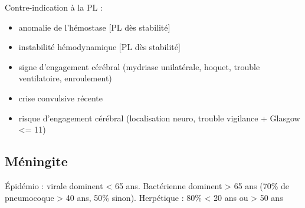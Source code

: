 \documentclass{article}
\begin{document}
Contre-indication à la PL :

\begin{itemize}
\item
  anomalie de l'hémostase {[}PL dès stabilité{]}
\item
  instabilité hémodynamique {[}PL dès stabilité{]}
\item
  signe d'engagement cérébral (mydriase unilatérale, hoquet, trouble
  ventilatoire, enroulement) {}
\item
  crise convulsive récente
\item
  risque d'engagement cérébral (localisation neuro, trouble vigilance +
  Glasgow \textless{}= 11) {}
\end{itemize}

\subsection{Méningite}
Épidémio : virale dominent < 65 ans. Bactérienne dominent > 65 ans (70\% de
pneumocoque > 40 ans, 50\% sinon). Herpétique :
80\% < 20 ans ou > 50 ans
\end{document}

